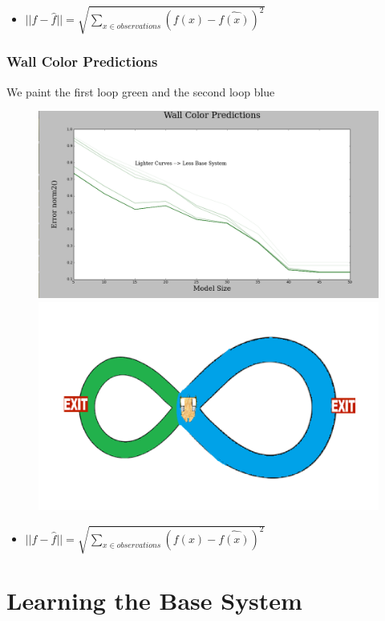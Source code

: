 \documentclass{beamer}
\begin{document}
\begin{frame}
\begin{columns}[c]
\end{columns}

\begin{itemize}

\item $||f - \hat{f}|| = \sqrt{\sum\nolimits_{x \in observations}(f(x) - \hat{f(x)})^2}$ 
\end{itemize}


\end{frame}


\begin{frame}
\frametitle{Wall Color Predictions}
We paint the first loop green and the second loop blue
\begin{figure}
\includegraphics[width=0.6\linewidth]{lucasplots/monImages/WallColorPredictions.png}
\includegraphics[width=0.4\linewidth]{lucasplots/monImages/doubleLoopImageMO.png}

\end{figure}

\begin{itemize}

\item $||f - \hat{f}|| = \sqrt{\sum\nolimits_{x \in observations}(f(x) - \hat{f(x)})^2}$ 
\end{itemize}

\end{frame}



\section{Learning the Base System}
\end{document}
